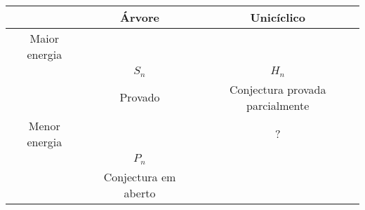 \begin{tabular}{|c|c|c|}
    \hline
    & Árvore & Unicíclico \\
    \hline
    \rule{0pt}{12ex}
    Maior energia &  &  \\
    & $S_n$ & $H_n$ \\
    & Provado & Conjectura provada parcialmente \\
    \hline
    \rule{0pt}{6ex}
    Menor energia &  & ? \\
    & $P_n$ & \\
    & Conjectura em aberto & \\
    \hline
\end{tabular}